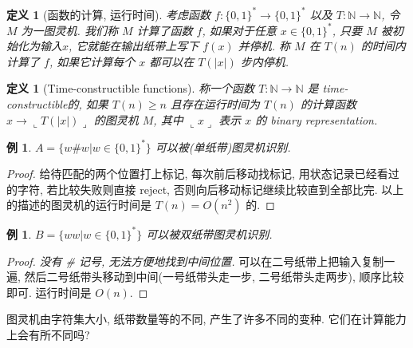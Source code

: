 \documentclass[8pt]{article}
\theoremstyle{compact}
\newtheorem{definition}[theorem]{定义}
\newtheorem{example}[theorem]{例}
\def\ge{\geqslant}
\def\rep#1{\llcorner{#1}\lrcorner}
\begin{document}
\begin{definition}[函数的计算, 运行时间]
	考虑函数 $f: \{0,  1\}^* \to \{0, 1\}^*$ 以及 $T: \mathbb{N} \to \mathbb{N}$, 令 $M$ 为一图灵机. 我们称 $M$ 计算了函数 $f$, 如果对于任意 $x \in \{0, 1\}^*$, 只要 $M$ 被初始化为输入$x$, 它就能在输出纸带上写下 $f(x)$ 并停机. 称 $M$ 在 $T(n)$ 的时间内计算了 $f$, 如果它计算每个 $x$ 都可以在 $T(|x|)$ 步内停机.
\end{definition}
\begin{definition}[Time-constructible functions]
	称一个函数 $T: \mathbb N \to \mathbb N$ 是 time-constructible的, 如果 $T(n) \ge n$ 且存在运行时间为 $T(n)$ 的计算函数 $x \to \rep{T(|x|)}$ 的图灵机 $M$, 其中 $\rep{x}$ 表示 $x$ 的 binary representation.
\end{definition}
\begin{example}
	$A = \{w \# w | w \in \{0, 1\}^*\}$ 可以被(单纸带)图灵机识别.
\end{example}
\begin{proof}
	给待匹配的两个位置打上标记, 每次前后移动找标记, 用状态记录已经看过的字符, 若比较失败则直接 reject, 否则向后移动标记继续比较直到全部比完. 以上的描述的图灵机的运行时间是 $T(n) = O(n^2)$ 的.
\end{proof}
\begin{example}
	$B = \{ww | w \in \{0, 1\}^*\}$ 可以被双纸带图灵机识别.
\end{example}
\begin{proof}
	\textit{没有 \# 记号, 无法方便地找到中间位置.} 可以在二号纸带上把输入复制一遍, 然后二号纸带头移动到中间(一号纸带头走一步, 二号纸带头走两步), 顺序比较即可. 运行时间是 $O(n)$.
\end{proof}

图灵机由字符集大小, 纸带数量等的不同, 产生了许多不同的变种. 它们在计算能力上会有所不同吗?
\end{document}
